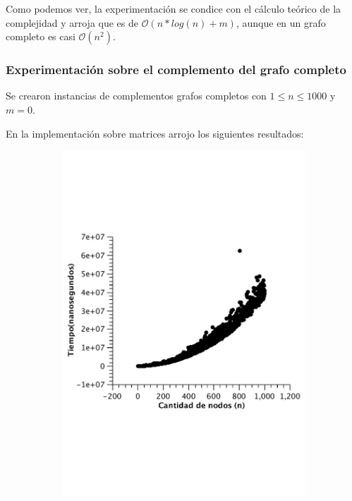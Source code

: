 Como podemos ver, la experimentación se condice con el cálculo teórico de la complejidad y arroja que es de $\mathcal{O}(n*log(n) + m)$, aunque en un grafo completo es casi $\mathcal{O}(n^2)$.

\subsubsection{Experimentación sobre el complemento del grafo completo}

Se crearon instancias de complementos grafos completos con $1 \leq n \leq 1000$ y $m = 0$.

En la implementación sobre matrices arrojo los siguientes resultados:\\

\begin{figure}[H]
        \centering
\begin{subfigure}[b]{0.45\textwidth}
                \includegraphics[width=\textwidth]{imagenes/vacio-matriz-1.pdf}

\end{subfigure}
\end{figure}
